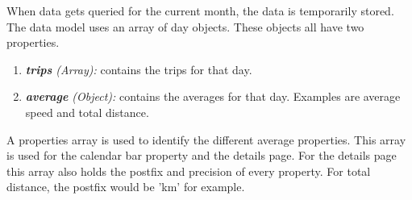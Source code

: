 When data gets queried for the current month, the data is temporarily stored. The data
model uses an array of day objects. These objects all have two properties.
\begin{enumerate}
	\item \textit{\textbf{trips} (Array):} contains the trips for that day.
	\item \textit{\textbf{average} (Object):} contains the averages for that day.
	Examples are average speed and total distance.
\end{enumerate}
A properties array is used to identify the different average properties. This array
is used for the calendar bar property and the details page. For the details page this
array also holds the postfix and precision of every property. For total distance, the
postfix would be 'km' for example.

